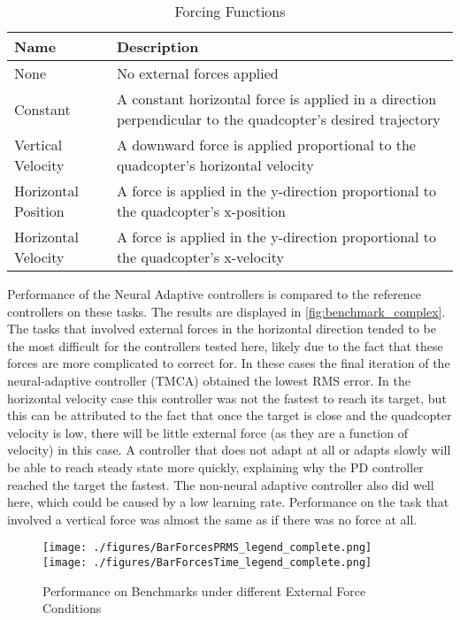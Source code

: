 \documentclass[letterpaper,12pt,titlepage,oneside,final]{book}
\begin{document}
\begin{table}
\caption{Forcing Functions} \label{table:forcingfunctions}
\begin{center}
\begin{tabular}{| l | p{9cm} |}
\hline
\textbf{Name} & \textbf{Description} \\ \hline
None & No external forces applied \\ \hline
Constant & A constant horizontal force is applied in a direction perpendicular to the quadcopter's desired trajectory\\ \hline
Vertical Velocity & A downward force is applied proportional to the quadcopter's horizontal velocity \\ \hline
Horizontal Position & A force is applied in the y-direction proportional to the quadcopter's x-position \\ \hline
Horizontal Velocity & A force is applied in the y-direction proportional to the quadcopter's x-velocity \\ \hline
\end{tabular}
\end{center}
\end{table}

Performance of the Neural Adaptive controllers is compared to the reference controllers on these tasks.
The results are displayed in \autoref{fig:benchmark_complex}.
The tasks that involved external forces in the horizontal direction tended to be the most difficult for the controllers tested here, likely due to the fact that these forces are more complicated to correct for.
In these cases the final iteration of the neural-adaptive controller (TMCA) obtained the lowest RMS error.
In the horizontal velocity case this controller was not the fastest to reach its target, but this can be attributed to the fact that once the target is close and the quadcopter velocity is low, there will be little external force (as they are a function of velocity) in this case. 
A controller that does not adapt at all or adapts slowly will be able to reach steady state more quickly, explaining why the PD controller reached the target the fastest.
The non-neural adaptive controller also did well here, which could be caused by a low learning rate.
Performance on the task that involved a vertical force was almost the same as if there was no force at all. 

\begin{figure}
\centering
\texttt{[image: ./figures/BarForcesPRMS\_legend\_complete.png]}
\texttt{[image: ./figures/BarForcesTime\_legend\_complete.png]}

\caption{Performance on Benchmarks under different External Force Conditions}
\label{fig:benchmark_complex}
\captionsetup{singlelinecheck=off,font=footnotesize}
\caption*{}
\end{figure}
\end{document}
